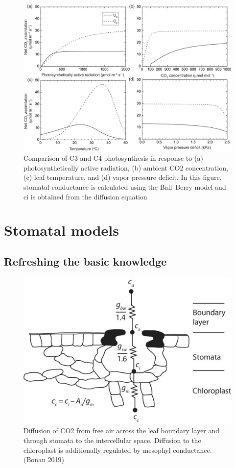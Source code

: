\documentclass[12pt,oneside]{book}
\begin{document}
\begin{figure}

{\centering \includegraphics[width=0.8\linewidth]{figures/chap2/c3_c4} 

}

\caption{Comparison of C3 and C4 photosynthesis in response to (a) photosynthetically active radiation, (b) ambient CO2 concentration, (c) leaf temperature, and (d) vapor pressure deficit. In this figure, stomatal conductance is calculated using the Ball–Berry model and ci is obtained from the diffusion equation}\label{fig:f210b}
\end{figure}

\section{Stomatal models}\label{stomatal-models}

\subsection{Refreshing the basic
knowledge}\label{refreshing-the-basic-knowledge-1}

\begin{figure}

{\centering \includegraphics[width=0.8\linewidth]{figures/chap2/conductance} 

}

\caption{Diffusion of CO2 from free air across the leaf boundary layer and through stomata to the intercellular space. Diffusion to the chloroplast is additionally regulated by mesophyl conductance. (Bonan 2019)}\label{fig:f211}
\end{figure}
\end{document}
